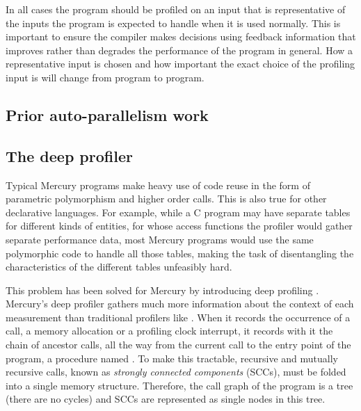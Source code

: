 In all cases the program should be profiled on an input that is
representative of the inputs the program is expected to handle when
it is used normally.
This is important to ensure the compiler makes decisions using
feedback information that improves rather than degrades the performance
of the program in general.
How a representative input is chosen and how important the exact choice
of the profiling input is will change from program to program.



\subsection{Prior auto-parallelism work}



\subsection{The deep profiler}

Typical Mercury programs make heavy use of code reuse in the form of
parametric polymorphism and higher order calls.
This is also true for other declarative languages.
For example, while a C program may have
separate tables for different kinds of entities,
for whose access functions
the profiler would gather separate performance data,
most Mercury programs would use
the same polymorphic code to handle all those tables,
making the task of disentangling the characteristics of the different tables
unfeasibly hard.

This problem has been solved for Mercury by introducing deep profiling
\citep{conway:2001:mercury-deep}.
Mercury's deep profiler gathers much more information about the context of
each measurement than traditional profilers like \cite{gprof}.
When it records the occurrence of a call,
a memory allocation or a profiling clock interrupt,
it records with it the chain of ancestor calls,
all the way from the current call to the entry point of the program,
a procedure named .
To make this tractable,
recursive and mutually recursive calls,
known as \emph{strongly connected components} (SCCs),
must be folded into a single memory structure.
Therefore, the call graph of the program is a tree (there are no cycles)
and SCCs are represented as single nodes in this tree.


